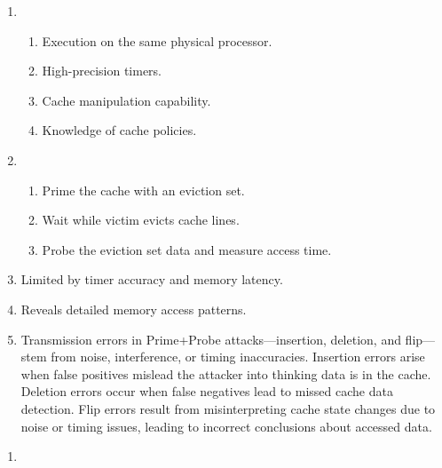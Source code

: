 \documentclass[sheet=2, english]{dexercise}
\begin{document}

\begin{enumerate}
  \item
    \begin{enumerate}
      \item Execution on the same physical processor.
      \item High-precision timers.
      \item Cache manipulation capability.
      \item Knowledge of cache policies.
    \end{enumerate}
  \item
    \begin{enumerate}
      \item Prime the cache with an eviction set.
      \item Wait while victim evicts cache lines.
      \item Probe the eviction set data and measure access time.
    \end{enumerate}
  \item Limited by timer accuracy and memory latency.
  \item Reveals detailed memory access patterns.
  \item
    Transmission errors in Prime+Probe attacks—insertion, deletion, and
    flip—stem from noise, interference, or timing inaccuracies.
    Insertion errors arise when false positives mislead the attacker into
    thinking data is in the cache.
    Deletion errors occur when false negatives lead to missed cache data
    detection.
    Flip errors result from misinterpreting cache state changes due to noise or
    timing issues, leading to incorrect conclusions about accessed data.
\end{enumerate}


\begin{enumerate}
  \item
\end{enumerate}
\end{document}
